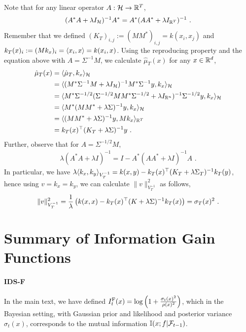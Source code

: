 Note that for any linear operator $A : \mathcal{H} \rightarrow \mathbb{R}^T$,
\begin{align*}
(A^*A + \lambda I_{\mathcal{H}})^{-1}A^* = A^* (AA^* + \lambda I_{\mathbb{R}^T})^{-1} \text{ .}
\end{align*}
Remember that we defined $(K_T)_{i,j} := (MM^*)_{i,j} = k(x_i,x_j)$ and $k_T(x)_i := (Mk_x)_i = \langle x_i, x\rangle = k(x_i,x)$. Using the reproducing property and the equation above with $A = \Sigma^{-1}M$, we calculate $\hat{\mu}_T(x)$ for any $x \in \mathbb{R}^d$,
\begin{align*}
\hat{\mu}_T(x) &= \langle\hat{\mu}_T, k_x \rangle_{\mathcal{H}}\\
&= \langle(M^*\Sigma^{-1}M +  \lambda I_{\mathcal{H}})^{-1} M^*\Sigma^{-1} y, k_x \rangle_{\mathcal{H}}\\
&= \langle M^*\Sigma^{-1/2}(\Sigma^{-1/2}MM^*\Sigma^{-1/2} + \lambda I_{\mathbb{R}^n})^{-1} \Sigma^{-1/2} y, k_x \rangle_{\mathcal{H}}\\
&= \langle M^*(MM^* + \lambda \Sigma)^{-1} y, k_x \rangle_{\mathcal{H}}\\
&=  \langle(MM^* + \lambda \Sigma)^{-1} y, M k_x \rangle_{\mathbb{R}^T}\\
&= k_T(x)^\top (K_T + \lambda \Sigma)^{-1}y \text{ .}
\end{align*}
Further, observe that for $A = \Sigma^{-1/2}M$,
\begin{align*}
\lambda(A^*A + \lambda I)^{-1} = I - A^*(A A^* + \lambda I)^{-1}A \text{ .}
\end{align*}
In particular, we have $\lambda \langle k_x,k_y\rangle_{V_T^{-1}} = k(x,y) - k_T(x)^\top (K_T + \lambda \Sigma_T)^{-1}k_T(y)$, hence using $v = k_x = k_y$, we can calculate $\|v\|_{V_T^{-1}}^2$ as follows,
\begin{align*}
\|v\|_{V_T^{-1}}^2 = \frac{1}{\lambda} \left(k(x,x) - k_T(x)^\top(K + \lambda \Sigma)^{-1}k_T(x)\right) = \sigma_T(x)^2 \text{ .}
\end{align*}
\section{Summary of Information Gain Functions}\label{app: information functions}
\paragraph{IDS-F} In the main text, we have defined $I_t^{\text{F}}(x) = \log\left(1 + \frac{\sigma_t(x)^2}{\rho(x)^2}\right)$, which in the Bayesian setting, with Gaussian prior and likelihood and posterior variance $\sigma_t(x)$, corresponds to the mutual information $\mathbb{I}(x;f|\mathcal{F}_{t-1})$.
